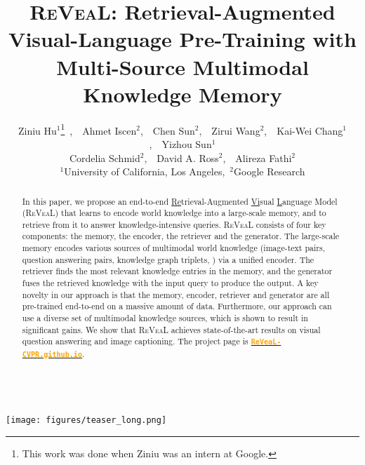 \documentclass[10pt,twocolumn,letterpaper]{article}
\newcommand{\method}{R\textsc{e}V\textsc{ea}L\xspace}
\begin{document}
\author{Ziniu Hu$^1$\thanks{This work was done when Ziniu was an intern at Google.}\
   ,\ \ Ahmet Iscen$^2$,\ \ Chen Sun$^2$,\ \ Zirui Wang$^2$,\ \ Kai-Wei Chang$^1$,\ \ Yizhou Sun$^1$ \\ 
   Cordelia Schmid$^2$,\ \ David A. Ross$^2$,\ \ Alireza Fathi$^2$  \\
      $^1$University of California, Los Angeles,\ $^2$Google Research
}






\title{\method: Retrieval-Augmented Visual-Language  Pre-Training with \\Multi-Source Multimodal Knowledge Memory}
\maketitle
\begin{strip}\centering
~\vspace{-4em}\\
    \texttt{[image: figures/teaser\_long.png]}
~\vspace{-1em}\\    
    \label{fig:fusion}
\end{strip}


\begin{abstract}



In this paper, we propose an end-to-end \underline{Re}trieval-Augmented \underline{Vi}sual \underline{L}anguage Model (\method) that learns to 
encode world knowledge into a large-scale memory, and to retrieve from it to answer knowledge-intensive queries.
\method consists of four key components: the memory, the encoder, the retriever and the generator. 
The large-scale memory encodes various sources of multimodal world knowledge (\eg image-text pairs, question answering pairs, knowledge graph triplets, \etc) via a unified encoder. 
The retriever finds the most relevant knowledge entries in the memory, and the generator fuses the retrieved knowledge with the input query to produce the output. A key novelty in our approach is that the memory, encoder, retriever and generator are all pre-trained end-to-end on a massive amount of data. Furthermore, our approach can use a diverse set of multimodal knowledge sources, which is shown to result in significant gains.  
We show that \method achieves state-of-the-art results on visual question answering and image captioning. The project page is {\tt \href{ReVeaL-CVPR.github.io}{\textbf{\textcolor{orange}{ReVeaL-CVPR.github.io}}}}.













 \end{abstract}
\end{document}

